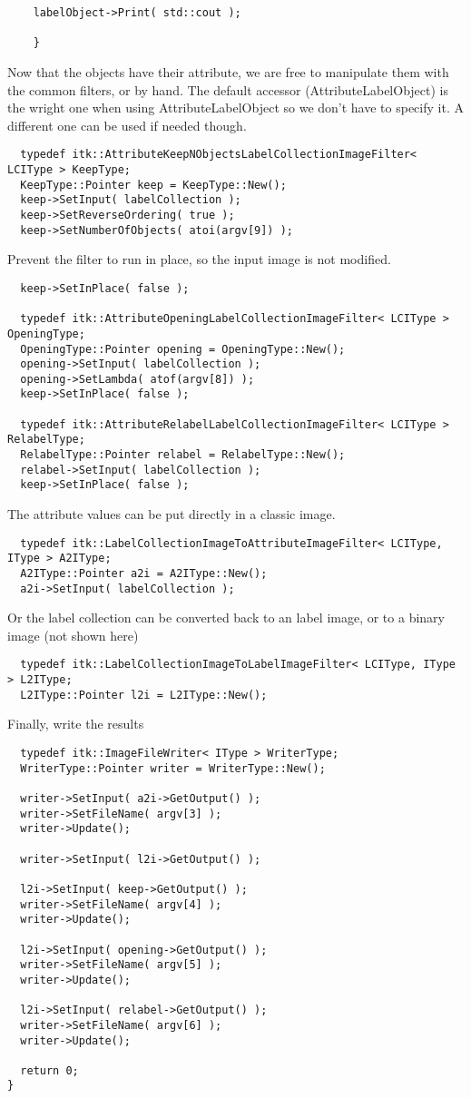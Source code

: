 \documentclass{InsightArticle}
\begin{document}
\small \begin{verbatim}
    labelObject->Print( std::cout );

    }
\end{verbatim} \normalsize
Now that the objects have their attribute, we are free to manipulate them with
the common filters, or by hand. The default accessor (AttributeLabelObject)
is the wright one when using AttributeLabelObject so we don't have to specify it.
A different one can be used if needed though.
\small \begin{verbatim}
  typedef itk::AttributeKeepNObjectsLabelCollectionImageFilter< LCIType > KeepType;
  KeepType::Pointer keep = KeepType::New();
  keep->SetInput( labelCollection );
  keep->SetReverseOrdering( true );
  keep->SetNumberOfObjects( atoi(argv[9]) );
\end{verbatim} \normalsize
Prevent the filter to run in place, so the input image is not modified.
\small \begin{verbatim}
  keep->SetInPlace( false );

  typedef itk::AttributeOpeningLabelCollectionImageFilter< LCIType > OpeningType;
  OpeningType::Pointer opening = OpeningType::New();
  opening->SetInput( labelCollection );
  opening->SetLambda( atof(argv[8]) );
  keep->SetInPlace( false );

  typedef itk::AttributeRelabelLabelCollectionImageFilter< LCIType > RelabelType;
  RelabelType::Pointer relabel = RelabelType::New();
  relabel->SetInput( labelCollection );
  keep->SetInPlace( false );
\end{verbatim} \normalsize
The attribute values can be put directly in a classic image.
\small \begin{verbatim}
  typedef itk::LabelCollectionImageToAttributeImageFilter< LCIType, IType > A2IType;
  A2IType::Pointer a2i = A2IType::New();
  a2i->SetInput( labelCollection );
\end{verbatim} \normalsize
Or the label collection can be converted back to an label image, or to a binary image
(not shown here)
\small \begin{verbatim}
  typedef itk::LabelCollectionImageToLabelImageFilter< LCIType, IType > L2IType;
  L2IType::Pointer l2i = L2IType::New();
\end{verbatim} \normalsize
Finally, write the results
\small \begin{verbatim}
  typedef itk::ImageFileWriter< IType > WriterType;
  WriterType::Pointer writer = WriterType::New();

  writer->SetInput( a2i->GetOutput() );
  writer->SetFileName( argv[3] );
  writer->Update();

  writer->SetInput( l2i->GetOutput() );

  l2i->SetInput( keep->GetOutput() );
  writer->SetFileName( argv[4] );
  writer->Update();

  l2i->SetInput( opening->GetOutput() );
  writer->SetFileName( argv[5] );
  writer->Update();

  l2i->SetInput( relabel->GetOutput() );
  writer->SetFileName( argv[6] );
  writer->Update();

  return 0;
}
\end{verbatim} \normalsize
\end{document}
